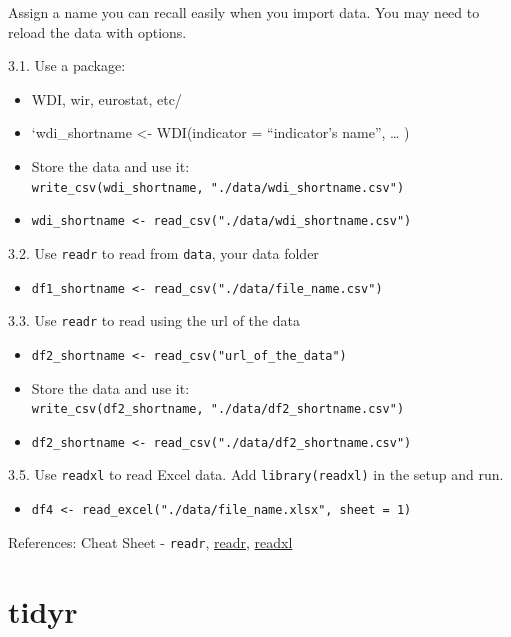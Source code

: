 \documentclass[
  xelatex, ja=standard]{bxjsbook}
\providecommand{\tightlist}{%
  \setlength{\itemsep}{0pt}\setlength{\parskip}{0pt}}
\theoremstyle{definition}
\theoremstyle{definition}
\theoremstyle{definition}
\theoremstyle{definition}
\theoremstyle{remark}
\begin{document}
Assign a name you can recall easily when you import data. You may need to reload the data with options.

3.1. Use a package:

\begin{itemize}
\tightlist
\item
  WDI, wir, eurostat, etc/
\item
  `wdi\_shortname \textless- WDI(indicator = ``indicator's name'', \ldots{} )
\item
  Store the data and use it: \texttt{write\_csv(wdi\_shortname,\ "./data/wdi\_shortname.csv")}
\item
  \texttt{wdi\_shortname\ \textless{}-\ read\_csv("./data/wdi\_shortname.csv")}
\end{itemize}

3.2. Use \texttt{readr} to read from \texttt{data}, your data folder

\begin{itemize}
\tightlist
\item
  \texttt{df1\_shortname\ \textless{}-\ read\_csv("./data/file\_name.csv")}
\end{itemize}

3.3. Use \texttt{readr} to read using the url of the data

\begin{itemize}
\tightlist
\item
  \texttt{df2\_shortname\ \textless{}-\ read\_csv("url\_of\_the\_data")}
\item
  Store the data and use it: \texttt{write\_csv(df2\_shortname,\ "./data/df2\_shortname.csv")}
\item
  \texttt{df2\_shortname\ \textless{}-\ read\_csv("./data/df2\_shortname.csv")}
\end{itemize}

3.5. Use \texttt{readxl} to read Excel data. Add \texttt{library(readxl)} in the setup and run.

\begin{itemize}
\tightlist
\item
  \texttt{df4\ \textless{}-\ read\_excel("./data/file\_name.xlsx",\ sheet\ =\ 1)}
\end{itemize}

References: Cheat Sheet - \texttt{readr}, \href{https://readr.tidyverse.org}{readr}, \href{https://readxl.tidyverse.org}{readxl}

\hypertarget{tidyr}{%
\section{tidyr}\label{tidyr}}
\end{document}
